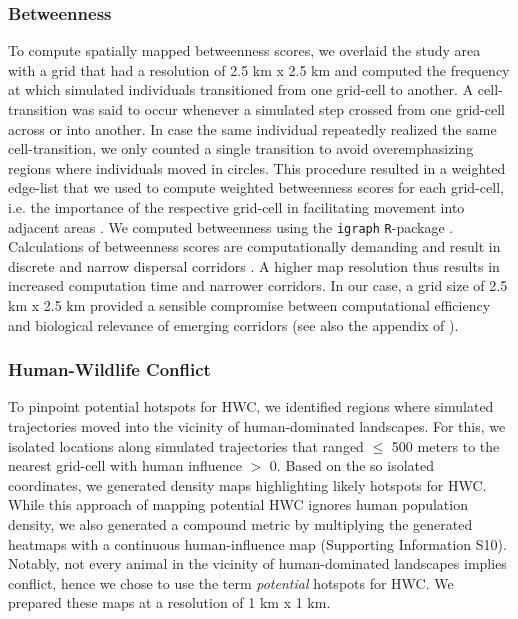 \documentclass[abstract=on,10pt,a4paper,bibliography=totocnumbered]{article}
\begin{document}
\subsubsection{Betweenness}

To compute spatially mapped betweenness scores, we overlaid the study area with
a grid that had a resolution of 2.5 km x 2.5 km and computed the frequency at
which simulated individuals transitioned from one grid-cell to another. A
cell-transition was said to occur whenever a simulated step crossed from one
grid-cell across or into another. In case the same individual repeatedly
realized the same cell-transition, we only counted a single transition to avoid
overemphasizing regions where individuals moved in circles. This procedure
resulted in a weighted edge-list that we used to compute weighted betweenness
scores for each grid-cell, i.e. the importance of the respective grid-cell in
facilitating movement into adjacent areas \citep{Bastille-Rousseau.2018,
Bastille-Rousseau.2021}. We computed betweenness using the \texttt{igraph}
\texttt{R}-package \citep{Csardi.2006}. Calculations of betweenness scores are
computationally demanding and result in discrete and narrow dispersal corridors
\citep{Hofmann.2023}. A higher map resolution thus results in increased
computation time and narrower corridors. In our case, a grid size of 2.5 km x
2.5 km provided a sensible compromise between computational efficiency and
biological relevance of emerging corridors (see also the appendix of
\citealp{Hofmann.2023}).

\subsubsection{Human-Wildlife Conflict}

To pinpoint potential hotspots for HWC, we identified regions where simulated
trajectories moved into the vicinity of human-dominated landscapes. For this, we
isolated locations along simulated trajectories that ranged $\leq$ 500 meters to
the nearest grid-cell with human influence $>$ 0. Based on the so isolated
coordinates, we generated density maps highlighting likely hotspots for HWC.
While this approach of mapping potential HWC ignores human population density,
we also generated a compound metric by multiplying the generated heatmaps with a
continuous human-influence map (Supporting Information S10). Notably, not every
animal in the vicinity of human-dominated landscapes implies conflict, hence we
chose to use the term \textit{potential} hotspots for HWC. We prepared these
maps at a resolution of 1 km x 1 km.
\end{document}
